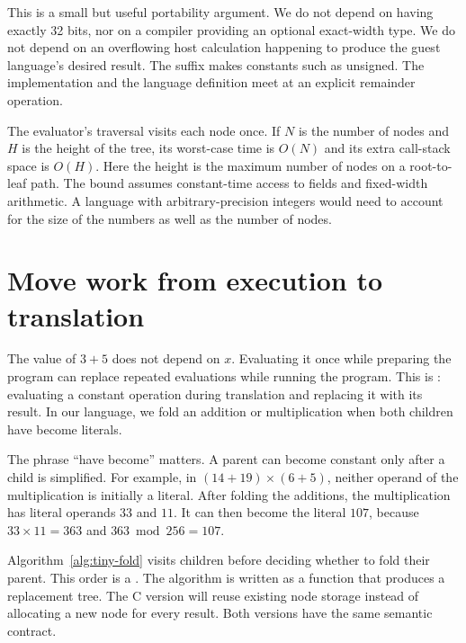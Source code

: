 This is a small but useful portability argument.
We do not depend on  having exactly 32 bits, nor on a compiler providing an optional exact-width type.
We do not depend on an overflowing host calculation happening to produce the guest language's desired result.
The suffix  makes constants such as  unsigned.
The implementation and the language definition meet at an explicit remainder operation.

The evaluator's traversal visits each node once.
If $N$ is the number of nodes and $H$ is the height of the tree, its worst-case time is $O(N)$ and its extra call-stack space is $O(H)$.
Here the height is the maximum number of nodes on a root-to-leaf path.
The bound assumes constant-time access to fields and fixed-width arithmetic.
A language with arbitrary-precision integers would need to account for the size of the numbers as well as the number of nodes.

\section{Move work from execution to translation}
\label{sec:tiny-constant-folding}

The value of $3+5$ does not depend on $x$.
Evaluating it once while preparing the program can replace repeated evaluations while running the program.
This is : evaluating a constant operation during translation and replacing it with its result.
In our language, we fold an addition or multiplication when both children have become literals.

The phrase \enquote{have become} matters.
A parent can become constant only after a child is simplified.
For example, in $(14+19)\times(6+5)$, neither operand of the multiplication is initially a literal.
After folding the additions, the multiplication has literal operands $33$ and $11$.
It can then become the literal $107$, because $33\times11=363$ and $363\bmod256=107$.

Algorithm~\ref{alg:tiny-fold} visits children before deciding whether to fold their parent.
This order is a .
The algorithm is written as a function that produces a replacement tree.
The C version will reuse existing node storage instead of allocating a new node for every result.
Both versions have the same semantic contract.


